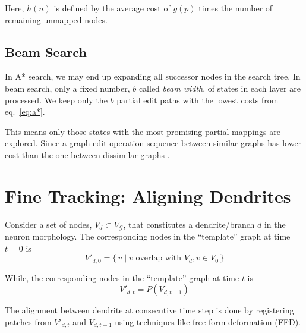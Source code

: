 \documentclass[10pt,letterpaper]{article}
\begin{document}
Here, $h(n)$ is defined by the average cost of $g(p)$ times the number of remaining unmapped nodes.

\subsection{Beam Search}
In A* search, we may end up expanding all successor nodes in the search tree. In beam search, only a fixed number, $b$ called \emph{beam width}, of states in each layer are processed. We keep only the $b$ partial edit paths with the lowest costs from eq.~\ref{eq:a*}. 

This means only those states with the most promising partial mappings are explored. Since a graph edit operation sequence between similar graphs has lower cost than the one between dissimilar graphs \cite{neuhaus2006}.


\section{Fine Tracking: Aligning Dendrites}
Consider a set of nodes, $V_d \subset V_\mathcal{G}$, that constitutes a dendrite/branch $d$ in the neuron morphology. The corresponding nodes in the ``template'' graph at time $t = 0$ is
\begin{equation}
V'_{d,0} = \{\,v \mid v \text{ overlap with } V_d, v \in V_0 \,\}
\end{equation}

While, the corresponding nodes in the ``template'' graph at time $t$ is
\begin{equation}
V'_{d,t} = P( V_{d,t-1})
\end{equation}

The alignment between dendrite at consecutive time step is done by registering patches from $V'_{d,t}$ and $V_{d,t-1}$ using techniques like free-form deformation (FFD).


\small{}
\end{document}
